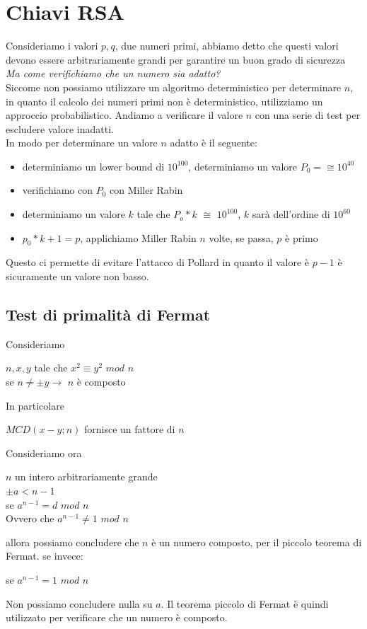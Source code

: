 \documentclass[11pt, oneside]{article}   	%
\begin{document}
\section*{Chiavi RSA}
Consideriamo i valori $p,q$, due numeri primi, abbiamo detto che questi valori devono essere arbitrariamente grandi per garantire un buon grado di sicurezza\\
\emph{Ma come verifichiamo che un numero sia adatto?}\\
Siccome non possiamo utilizzare un algoritmo deterministico per determinare $n$, in quanto il calcolo dei numeri primi non è deterministico, utilizziamo un approccio probabilistico. Andiamo a verificare il valore $n$ con una serie di test per escludere valore inadatti.\\
In modo per determinare un valore $n$ adatto è il seguente:
\begin{itemize}
\item determiniamo un lower bound di $10^{100}$, determiniamo un valore $P_0 = \cong10^{40}$
\item verifichiamo con $P_0$ con Miller Rabin
\item determiniamo un valore $k$ tale che $P_o * k$ $\cong$ $10^{100}$, $k$ sarà dell'ordine di $10^{60}$
\item $p_0 * k+1 = p$, applichiamo Miller Rabin $n$ volte, se passa, $p$ è primo
\end{itemize}
Questo ci permette di evitare l'attacco di Pollard in quanto il valore è $p-1$ è sicuramente un valore non basso.
\subsection*{Test di primalità di Fermat}
Consideriamo
\begin{center}
$n, x, y$ tale che $x^2 \equiv y^2$ $mod$ $n$\\
se $n \neq \pm y \rightarrow$ $n$ è composto
\end{center}
In particolare
\begin{center}
$MCD(x-y; n)$ fornisce un fattore di $n$
\end{center}
Consideriamo ora \begin{center}
$n$ un intero arbitrariamente grande\\
$\pm a < n-1$\\
se $a^{n-1} = d$ $mod$ $n$\\
Ovvero che $a^{n-1} \neq 1$ $mod$ $n$
\end{center}
allora possiamo concludere che $n$ è  un numero composto, per il piccolo teorema di Fermat.
se invece: 
\begin{center}
se $a^{n-1} = 1$ $mod$ $n$
\end{center}
Non possiamo concludere nulla su $a$. Il teorema piccolo di Fermat è quindi utilizzato per verificare che un numero è composto.\\
\end{document}
